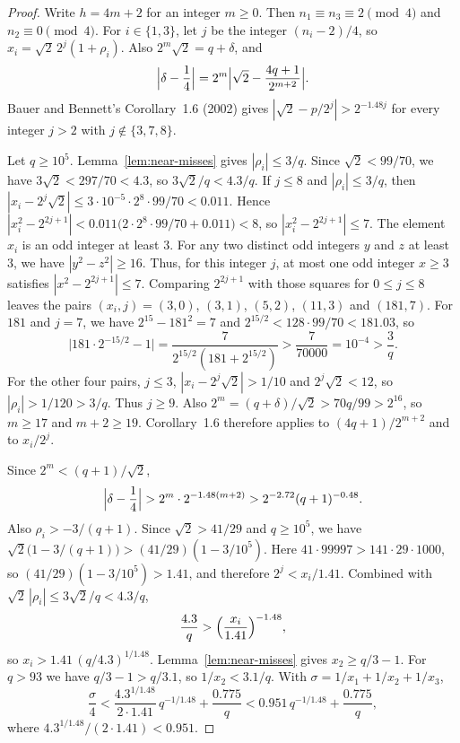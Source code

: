 \documentclass[11pt]{article}
\begin{document}
\begin{proof}
Write $h = 4m + 2$ for an integer $m \ge 0$.
Then $n_1 \equiv n_3 \equiv 2 \pmod{4}$ and $n_2 \equiv 0 \pmod{4}$.
For $i \in \{1, 3\}$, let $j$ be the integer $(n_i - 2)/4$, so $x_i = \sqrt{2}\, 2^{j}(1+\rho_i)$.
Also $2^m \sqrt{2} = q + \delta$, and
\[
\Bigl|\delta - \frac14\Bigr| = 2^m \Bigl|\sqrt{2} - \frac{4q+1}{2^{m+2}}\Bigr|.
\]
Bauer and Bennett's Corollary~1.6 (2002) gives $|\sqrt{2} - p/2^j| > 2^{-1.48 j}$ for every integer $j > 2$ with $j \notin \{3, 7, 8\}$.

Let $q \ge 10^5$.
Lemma~\ref{lem:near-misses} gives $|\rho_i| \le 3/q$.
Since $\sqrt{2} < 99/70$, we have $3\sqrt{2} < 297/70 < 4.3$, so $3\sqrt{2}/q < 4.3/q$.
If $j \le 8$ and $|\rho_i| \le 3/q$, then $|x_i - 2^j \sqrt{2}| \le 3 \cdot 10^{-5} \cdot 2^8 \cdot 99/70 < 0.011$.
Hence $|x_i^2 - 2^{2j+1}| < 0.011\bigl(2 \cdot 2^8 \cdot 99/70 + 0.011\bigr) < 8$, so $|x_i^2 - 2^{2j+1}| \le 7$.
The element $x_i$ is an odd integer at least $3$.
For any two distinct odd integers $y$ and $z$ at least $3$, we have $|y^2 - z^2| \ge 16$.
Thus, for this integer $j$, at most one odd integer $x \ge 3$ satisfies $|x^2 - 2^{2j+1}| \le 7$.
Comparing $2^{2j+1}$ with those squares for $0 \le j \le 8$ leaves the pairs $(x_i, j) = (3, 0)$, $(3, 1)$, $(5, 2)$, $(11, 3)$ and $(181, 7)$.
For $181$ and $j = 7$, we have $2^{15} - 181^2 = 7$ and $2^{15/2} < 128 \cdot 99/70 < 181.03$, so
\[
\bigl|181 \cdot 2^{-15/2} - 1\bigr| = \frac{7}{2^{15/2}(181 + 2^{15/2})} > \frac{7}{70000} = 10^{-4} > \frac{3}{q}.
\]
For the other four pairs, $j \le 3$, $|x_i - 2^j \sqrt{2}| > 1/10$ and $2^j \sqrt{2} < 12$, so $|\rho_i| > 1/120 > 3/q$.
Thus $j \ge 9$.
Also $2^m = (q+\delta)/\sqrt{2} > 70q/99 > 2^{16}$, so $m \ge 17$ and $m+2 \ge 19$.
Corollary~1.6 therefore applies to $(4q+1)/2^{m+2}$ and to $x_i/2^j$.

Since $2^m < (q+1)/\sqrt{2}$,
\[
\Bigl|\delta - \frac14\Bigr| > 2^m \cdot 2^{-1.48(m+2)} > 2^{-2.72}(q+1)^{-0.48}.
\]
Also $\rho_i > -3/(q+1)$.
Since $\sqrt{2} > 41/29$ and $q \ge 10^5$, we have $\sqrt{2}\bigl(1 - 3/(q+1)\bigr) > (41/29)(1 - 3/10^5)$.
Here $41 \cdot 99997 > 141 \cdot 29 \cdot 1000$, so $(41/29)(1 - 3/10^5) > 1.41$, and therefore $2^j < x_i/1.41$.
Combined with $\sqrt{2}\,|\rho_i| \le 3\sqrt{2}/q < 4.3/q$,
\[
\frac{4.3}{q} > \Bigl(\frac{x_i}{1.41}\Bigr)^{-1.48},
\]
so $x_i > 1.41\,(q/4.3)^{1/1.48}$.
Lemma~\ref{lem:near-misses} gives $x_2 \ge q/3 - 1$.
For $q > 93$ we have $q/3 - 1 > q/3.1$, so $1/x_2 < 3.1/q$.
With $\sigma = 1/x_1 + 1/x_2 + 1/x_3$,
\[
\frac{\sigma}{4} < \frac{4.3^{1/1.48}}{2 \cdot 1.41}\, q^{-1/1.48} + \frac{0.775}{q} < 0.951\, q^{-1/1.48} + \frac{0.775}{q},
\]
where $4.3^{1/1.48}/(2 \cdot 1.41) < 0.951$.


\end{proof}
\end{document}
